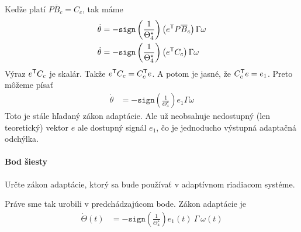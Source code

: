 \documentclass[a4paper, 10pt, ]{article}
\begin{document}
Keďže platí $P \overline{B}_c = {C_c}$, tak máme
\begin{subequations}
	\begin{align}
        \dot{\theta} &= - \texttt{sign}\left(\frac{1}{\Theta_4^\star}\right) \left( e^{\mathsf{T}} P \overline{B}_c \right) \Gamma \omega \\
    	\dot{\theta} &= - \texttt{sign}\left(\frac{1}{\Theta_4^\star}\right) \left( e^{\mathsf{T}} C_c \right) \Gamma \omega
	\end{align}
\end{subequations}
Výraz $e^{\mathsf{T}} C_c$ je skalár. Takže $e^{\mathsf{T}} C_c = C_c^{\mathsf{T}} e$. A potom je jasné, že $C_c^{\mathsf{T}} e = e_1$. Preto môžeme písať
	\begin{align}
    	\dot{\theta} &= - \texttt{sign}\left(\frac{1}{\Theta_4^\star}\right) e_1 \Gamma \omega
	\end{align}
Toto je stále hľadaný zákon adaptácie. Ale už neobsahuje nedostupný (len teoretický) vektor $e$ ale dostupný signál $e_1$, čo je jednoducho výstupná adaptačná odchýlka.













\paragraph{Bod šiesty}

\smallskip

{\color{gray}

Určte zákon adaptácie, ktorý sa bude používať v adaptívnom riadiacom systéme.

}

\smallskip

\noindent
Práve sme tak urobili v predchádzajúcom bode. Zákon adaptácie je
\begin{align}
    \dot \Theta(t) &= - \texttt{sign}\left(\frac{1}{\Theta_4^\star}\right) e_1(t)\ \Gamma\ \omega(t)
\end{align}
\end{document}
